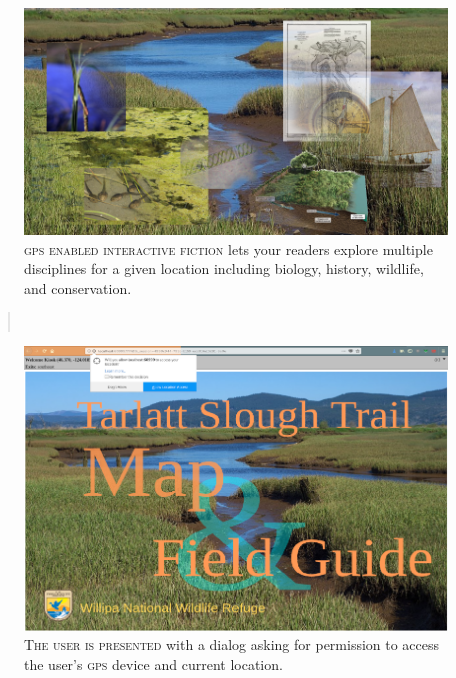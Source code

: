 \begin{figure}[h]                                                           
 \includegraphics[width=\linewidth]{./media/images/multiple_paths}%
  \scriptsize{\textsc{\\gps enabled interactive fiction} lets your readers explore
  multiple disciplines for a given location including biology, history,
  wildlife, and conservation.}
  \label{fig:multiple_paths}%
\end{figure}                                                                
\begin{quotation} 
\noindent{}\\[.5mm]

\hfill{}
\end{quotation} 
\begin{figure}[h]                                                           
 \includegraphics[width=\linewidth]{./media/images/trail_gps.pdf}%
  \scriptsize{\textsc{\\ The user is presented} with a dialog asking for
    permission to access the user's \textsc{gps} device and current location.}
  \label{fig:gps_location}%
\end{figure}
